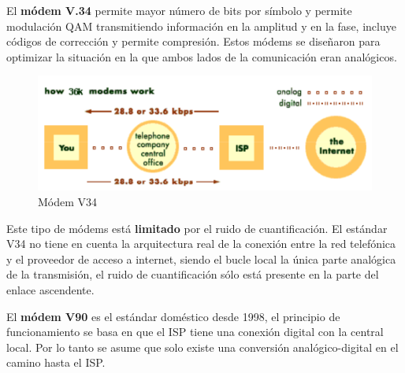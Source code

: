\documentclass[10pt,portrait, twocolumn]{article}
\makeatletter
\renewcommand{\subsubsection}{\@startsection{subsubsection}{3}{0mm}%
                                {-1ex plus -.5ex minus -.2ex}%
                                {1ex plus .2ex}%
                                {\normalfont\small\bfseries}}
\makeatother
\begin{document}

El \textbf{módem V.34} permite mayor número de bits por símbolo y permite modulación QAM transmitiendo información en la amplitud y en la fase, incluye códigos de corrección y permite compresión. Estos módems se diseñaron para optimizar la situación en la que ambos lados de la comunicación eran analógicos.


	\begin{figure}[!ht]
 		\centering
  		 \includegraphics[scale = 0.25]{images/ModemV34}
		\caption{Módem V34}
	\end{figure}

Este tipo de módems está \textbf{limitado} por el ruido de cuantificación. El estándar V34 no tiene en cuenta la arquitectura real de la conexión entre la red telefónica y el proveedor de acceso a internet, siendo el bucle local la única parte analógica de la transmisión, el ruido de cuantificación sólo está presente en la parte del enlace ascendente.


El \textbf{módem V90} es el estándar doméstico desde 1998, el principio de funcionamiento se basa en que el ISP tiene una conexión digital con la central local. Por lo tanto se asume que solo existe una conversión analógico-digital en el camino hasta el ISP.

\end{document}

